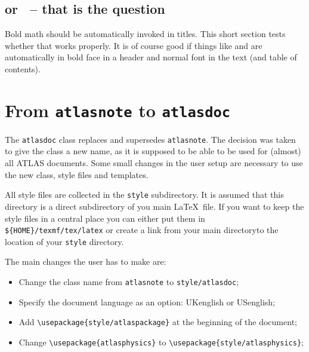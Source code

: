 \documentclass[koma,UKenglish]{style/atlasdoc}
\newcommand{\Macro}[1]{\texttt{\textbackslash #1}\xspace}
\begin{document}
\subsection{\pT or \ET\ -- that is the question}

Bold math should be automatically invoked in titles.
This short section tests whether that works properly.
It is of course good if things like \pT and \ET are automatically in bold face in
a header and normal font in the text (and table of contents).

\section{From \texttt{atlasnote} to \texttt{atlasdoc}}
\label{sec:oldnote}

The \texttt{atlasdoc} class replaces and supersedes \texttt{atlasnote}.
The decision was taken to give the class a new name, as it is supposed to be
able to be used for (almost) all ATLAS documents.
Some small changes in the user setup are necessary to use the new
class, style files and templates.

All style files are collected in the \texttt{style} subdirectory.
It is assumed that this directory is a direct subdirectory of you main \LaTeX\ file.
If you want to keep the style files in a central place you can either put them in
\verb|${HOME}/texmf/tex/latex| or create a link from your main directoryto the location of
your \texttt{style} directory.

The main changes the user has to make are:
\begin{itemize}
\item Change the class name from \texttt{atlasnote} to \texttt{style/atlasdoc};
\item Specify the document language as an option: UKenglish or USenglish;
\item Add \verb|\usepackage{style/atlaspackage}| at the beginning of the document;
\item Change \verb|\usepackage{atlasphysics}| to \verb|\usepackage{style/atlasphysics}|; 
\end{itemize}
\end{document}
